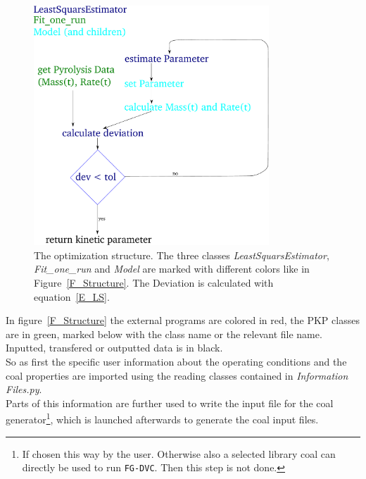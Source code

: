 \begin{figure}
\centering%
\includegraphics[height=9cm,angle=0]{Figures/FittingProcedure}
\caption{The optimization structure. The three classes \textit{LeastSquarsEstimator}, \textit{Fit\_one\_run} and \textit{Model} are marked with different colors like in Figure~\ref{F_Structure}. The Deviation is calculated with equation~\ref{E_LS}.}
\label{F_OptimizationProc}
\end{figure}

In figure~\ref{F_Structure} the external programs are colored in red, the PKP classes are in green, marked below with the class name or the relevant file name. Inputted, transfered or outputted data is in black.\\
So as first the specific user information about the operating conditions and the coal properties are imported using the reading classes contained in \emph{Information Files.py}.\\
Parts of this information are further used to write the input file for the \FGDVC coal generator\footnote{If chosen this way by the user. Otherwise also a selected \FGDVC library coal can directly be used to run \texttt{FG-DVC}. Then this step is not done.}, which is launched afterwards to generate the \FGDVC coal input files.\\

